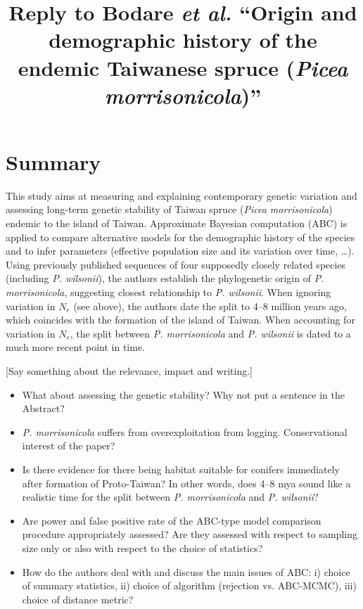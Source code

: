 \documentclass[11pt]{article}
\title{Reply to Bodare \emph{et al.} ``Origin and demographic history of the endemic Taiwanese spruce (\emph{Picea morrisonicola})''}
\begin{document}
\maketitle

\section{Summary}
This study aims at measuring and explaining contemporary genetic variation and assessing long-term genetic stability of Taiwan spruce (\emph{Picea morrisonicola}) endemic to the island of Taiwan. Approximate Bayesian computation (ABC) is applied to compare alternative models for the demographic history of the species and to infer parameters (effective population size and its variation over time, \dots). Using previously published sequences of four supposedly closely related species (including \emph{P. wilsonii}), the authors establish the phylogenetic origin of \emph{P. morrisonicola}, suggesting closest relationship to \emph{P. wilsonii}. When ignoring variation in $N_{e}$ (see above), the authors date the split to 4--8 million years ago, which coincides with the formation of the island of Taiwan. When accounting for variation in $N_e$, the split between \emph{P. morrisonicola} and \emph{P. wilsonii} is dated to a much more recent point in time.


[Say something about the relevance, impact and writing.]

\begin{itemize}
	\item What about assessing the genetic stability? Why not put a sentence in the Abstract?
	\item \emph{P. morrisonicola} suffers from overexploitation from logging. Conservational interest of the paper?
	\item Is there evidence for there being habitat suitable for conifers immediately after formation of Proto-Taiwan? In other words, does 4--8 mya sound like a realistic time for the split between \emph{P. morrisonicola} and \emph{P. wilsonii}?
	\item Are power and false positive rate of the ABC-type model comparison procedure appropriately assessed? Are they assessed with respect to sampling size only or also with respect to the choice of statistics?
	\item How do the authors deal with and discuss the main issues of ABC: i) choice of summary statistics, ii) choice of algorithm (rejection vs. ABC-MCMC), iii) choice of distance metric?
\end{itemize}
\end{document}
